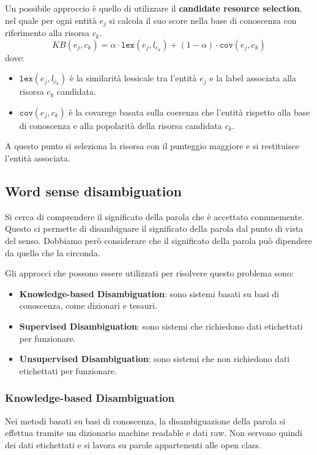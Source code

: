 Un possibile approccio è quello di utilizzare il \textbf{candidate resource selection},
nel quale per ogni entità $e_j$ si calcola il suo score nella base di conoscenza
con riferimento alla risorsa $c_k$.
\begin{equation}
      KB(e_j, c_k) = \alpha \cdot \texttt{lex}(e_j, l_{c_k}) + (1 - \alpha) \cdot \texttt{cov}(e_j, c_k)
\end{equation}
dove:
\begin{itemize}
      \item $\texttt{lex}(e_j, l_{c_k})$ è la similarità lessicale tra l'entità
            $e_j$ e la label associata alla risorsa $c_k$ candidata.
      \item $\texttt{cov}(e_j, c_k)$ è la covarege basata sulla coerenza che l'entità
            rispetto alla base di conoscenza e alla popolarità della risorsa candidata $c_k$.
\end{itemize}
A questo punto si seleziona la risorsa con il punteggio maggiore e si restituisce
l'entità associata.
\subsection{Word sense disambiguation}
Si cerca di comprendere il significato della parola che è accettato comunemente.
Questo ci permette di disambiguare il significato della parola dal punto di
vista del senso. Dobbiamo però considerare che il significato della parola può
dipendere da quello che la circonda.

Gli approcci che possono essere utilizzati per risolvere questo problema sono:
\begin{itemize}
      \item \textbf{Knowledge-based Disambiguation}: sono sistemi basati su basi
            di conoscenza, come dizionari e tesauri.
      \item \textbf{Supervised Disambiguation}: sono sistemi che richiedono dati
            etichettati per funzionare.
      \item \textbf{Unsupervised Disambiguation}: sono sistemi che non richiedono
            dati etichettati per funzionare.
\end{itemize}
\subsubsection{Knowledge-based Disambiguation}
Nei metodi basati su basi di conoscenza, la disambiguazione della parola si
effettua tramite un dizionario machine readable e dati raw. Non servono quindi
dei dati etichettati e si lavora su parole appartenenti alle open class.

